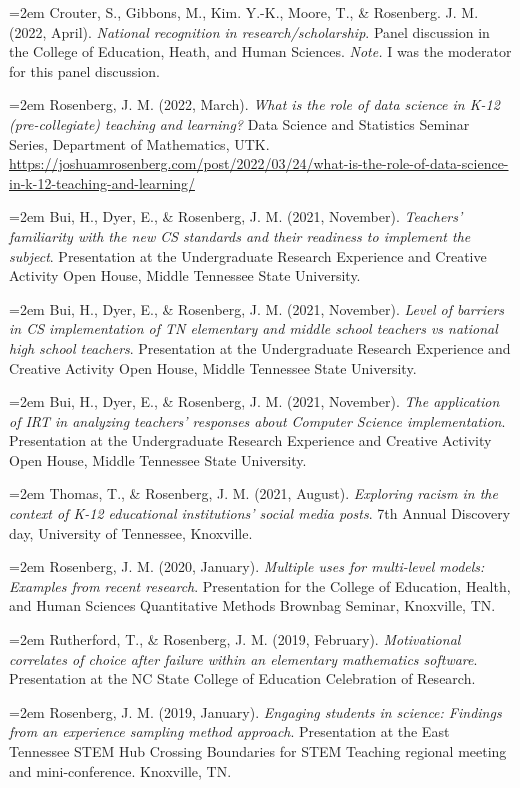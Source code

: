 \documentclass[
  14,
]{article}
\begin{document}
\hangindent=2em Crouter, S., Gibbons, M., Kim. Y.-K., Moore, T., \&
Rosenberg. J. M. (2022, April). \emph{National recognition in
research/scholarship}. Panel discussion in the College of Education,
Heath, and Human Sciences. \emph{Note.} I was the moderator for this
panel discussion.

\hangindent=2em Rosenberg, J. M. (2022, March). \emph{What is the role
of data science in K-12 (pre-collegiate) teaching and learning?} Data
Science and Statistics Seminar Series, Department of Mathematics, UTK.
\url{https://joshuamrosenberg.com/post/2022/03/24/what-is-the-role-of-data-science-in-k-12-teaching-and-learning/}

\hangindent=2em Bui, H., Dyer, E., \& Rosenberg, J. M. (2021, November).
\emph{Teachers' familiarity with the new CS standards and their
readiness to implement the subject}. Presentation at the Undergraduate
Research Experience and Creative Activity Open House, Middle Tennessee
State University.

\hangindent=2em Bui, H., Dyer, E., \& Rosenberg, J. M. (2021, November).
\emph{Level of barriers in CS implementation of TN elementary and middle
school teachers vs national high school teachers}. Presentation at the
Undergraduate Research Experience and Creative Activity Open House,
Middle Tennessee State University.

\hangindent=2em Bui, H., Dyer, E., \& Rosenberg, J. M. (2021, November).
\emph{The application of IRT in analyzing teachers' responses about
Computer Science implementation}. Presentation at the Undergraduate
Research Experience and Creative Activity Open House, Middle Tennessee
State University.

\hangindent=2em Thomas, T., \& Rosenberg, J. M. (2021, August).
\emph{Exploring racism in the context of K-12 educational institutions'
social media posts}. 7th Annual Discovery day, University of Tennessee,
Knoxville.

\hangindent=2em Rosenberg, J. M. (2020, January). \emph{Multiple uses
for multi-level models: Examples from recent research}. Presentation for
the College of Education, Health, and Human Sciences Quantitative
Methods Brownbag Seminar, Knoxville, TN.

\hangindent=2em Rutherford, T., \& Rosenberg, J. M. (2019, February).
\emph{Motivational correlates of choice after failure within an
elementary mathematics software}. Presentation at the NC State College
of Education Celebration of Research.

\hangindent=2em Rosenberg, J. M. (2019, January). \emph{Engaging
students in science: Findings from an experience sampling method
approach}. Presentation at the East Tennessee STEM Hub Crossing
Boundaries for STEM Teaching regional meeting and mini-conference.
Knoxville, TN.
\end{document}
